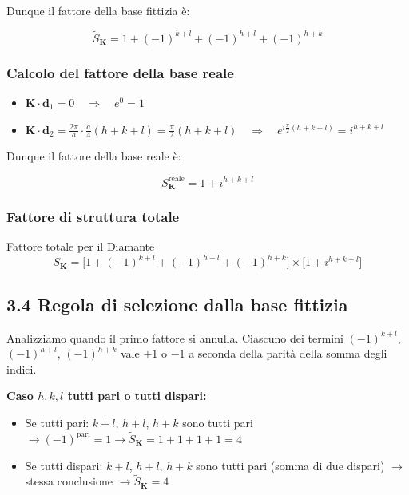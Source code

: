 Dunque il fattore della base fittizia è:

$$\tilde{S}_{\mathbf{K}} = 1 + (-1)^{k+l} + (-1)^{h+l} + (-1)^{h+k}$$

\subsubsection*{Calcolo del fattore della base reale}

\begin{itemize}
    \item $\mathbf{K} \cdot \mathbf{d}_1 = 0 \quad\Rightarrow\quad e^{0} = 1$
    \item $\mathbf{K} \cdot \mathbf{d}_2 = \frac{2\pi}{a} \cdot \frac{a}{4}(h + k + l) = \frac{\pi}{2}(h + k + l) \quad\Rightarrow\quad e^{i\frac{\pi}{2}(h+k+l)} = i^{h+k+l}$
\end{itemize}

Dunque il fattore della base reale è:

$$S^{\text{reale}}_{\mathbf{K}} = 1 + i^{h+k+l}$$

\subsubsection*{Fattore di struttura totale}

\begin{equazione}{Fattore totale per il Diamante}
\begin{equation}
S_{\mathbf{K}} = \Big[1 + (-1)^{k+l} + (-1)^{h+l} + (-1)^{h+k}\Big] \times \Big[1 + i^{h+k+l}\Big]
\end{equation}
\end{equazione}

\subsection*{3.4 Regola di selezione dalla base fittizia}

Analizziamo quando il primo fattore si annulla. Ciascuno dei termini $(-1)^{k+l}$, $(-1)^{h+l}$, $(-1)^{h+k}$ vale $+1$ o $-1$ a seconda della parità della somma degli indici.

\textbf{Caso $h, k, l$ tutti pari o tutti dispari:}
\begin{itemize}
    \item Se tutti pari: $k+l$, $h+l$, $h+k$ sono tutti pari $\to (-1)^{\text{pari}} = 1 \to \tilde{S}_{\mathbf{K}} = 1 + 1 + 1 + 1 = 4$
    \item Se tutti dispari: $k+l$, $h+l$, $h+k$ sono tutti pari (somma di due dispari) $\to$ stessa conclusione $\to \tilde{S}_{\mathbf{K}} = 4$
\end{itemize}

